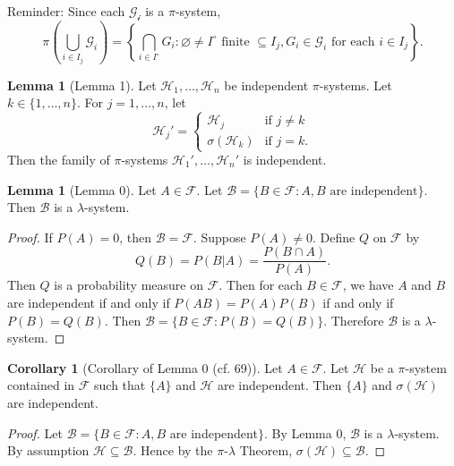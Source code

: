 \documentclass{article}
\newcommand{\F}{\mathscr{F}}
\theoremstyle{definition}
\newtheorem{corollary}[theorem]{Corollary}
\newtheorem{lemma}[theorem]{Lemma}
\begin{document}
Reminder: Since each $\mathscr{G_i}$ is a $\pi$-system,
\[
    \pi\left(\bigcup_{i \in I_j} \mathscr{G}_i\right) = \left\{ \bigcap_{i \in I^\circ} G_i : \varnothing \neq I^\circ \text{ finite } \subseteq I_j, G_i \in \mathscr{G}_i \text{ for each } i \in I_j \right\}.
\]

\begin{lemma}[Lemma 1]
    Let $\mathscr{H}_1, \dots, \mathscr{H}_n$ be independent $\pi$-systems. Let $k \in \{1, \dots, n\}$. For $j = 1, \dots, n$, let
    \[
        \mathscr{H}_j' = \begin{cases}
            \mathscr{H}_j & \text{if } j \neq k \\
            \sigma(\mathscr{H}_k) & \text{if } j = k.
        \end{cases}
    \]
    Then the family of $\pi$-systems $\mathscr{H}_1',\dots, \mathscr{H}_n'$ is independent.
\end{lemma}

\begin{lemma}[Lemma 0]
    Let $A \in \F$. Let $\mathscr{B} = \{B \in \F : A, B \text{ are independent}\}$. Then $\mathscr{B}$ is a $\lambda$-system.
\end{lemma}
\begin{proof}
    If $P(A) = 0$, then $\mathscr{B} = \F$. Suppose $P(A) \neq 0$. Define $Q$ on $\F$ by
    \[
        Q(B) = P(B|A) = \frac{P(B \cap A)}{P(A)}.
    \]
    Then $Q$ is a probability measure on $\F$. Then for each $B \in \F$, we have $A$ and $B$ are independent if and only if $P(AB) = P(A)P(B)$ if and only if $P(B) = Q(B)$. Then $\mathscr{B} = \{B \in \F : P(B) = Q(B)\}$. Therefore $\mathscr{B}$ is a $\lambda$-system.
\end{proof}
\begin{corollary}[Corollary of Lemma 0 (cf. 69)]
    Let $A \in \F$. Let $\mathscr{H}$ be a $\pi$-system contained in $\F$ such that $\{A\}$ and $\mathscr{H}$ are independent. Then $\{A\}$ and $\sigma(\mathscr{H})$ are independent.
\end{corollary}
\begin{proof}
    Let $\mathscr{B} = \{B \in \F : A, B$ are independent$\}$. By Lemma 0, $\mathscr{B}$ is a $\lambda$-system. By assumption $\mathscr{H} \subseteq \mathscr{B}$. Hence by the $\pi$-$\lambda$ Theorem, $\sigma(\mathscr{H}) \subseteq \mathscr{B}$.
\end{proof}
\end{document}
